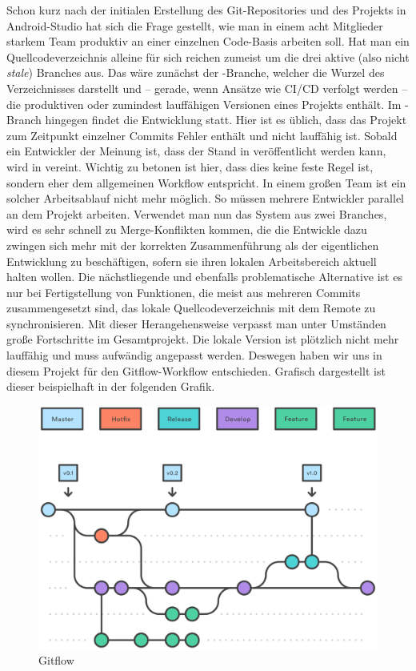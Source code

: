 Schon kurz nach der initialen Erstellung des Git-Repositories und des Projekts in Android-Studio hat sich die Frage gestellt, wie man in einem acht Mitglieder starkem Team produktiv an einer einzelnen Code-Basis arbeiten soll. Hat man ein Quellcodeverzeichnis alleine für sich reichen zumeist um die drei aktive (also nicht \textit{stale}) Branches aus. Das wäre zunächst der -Branche, welcher die Wurzel des Verzeichnisses darstellt und – gerade, wenn Ansätze wie CI/CD verfolgt werden – die produktiven oder zumindest lauffähigen Versionen eines Projekts enthält. Im -Branch hingegen findet die Entwicklung statt. Hier ist es üblich, dass das Projekt zum Zeitpunkt einzelner Commits Fehler enthält und nicht lauffähig ist. Sobald ein Entwickler der Meinung ist, dass der Stand in  veröffentlicht werden kann, wird  in  vereint. Wichtig zu betonen ist hier, dass dies keine feste Regel ist, sondern eher dem allgemeinen Workflow entspricht. In einem großen Team ist ein solcher Arbeitsablauf nicht mehr möglich. So müssen mehrere Entwickler parallel an dem Projekt arbeiten. Verwendet man nun das System aus zwei Branches, wird es sehr schnell zu Merge-Konflikten kommen, die die Entwickle dazu zwingen sich mehr mit der korrekten Zusammenführung als der eigentlichen Entwicklung zu beschäftigen, sofern sie ihren lokalen Arbeitsbereich aktuell halten wollen. Die nächstliegende und ebenfalls problematische Alternative ist es nur bei Fertigstellung von Funktionen, die meist aus mehreren Commits zusammengesetzt sind, das lokale Quellcodeverzeichnis mit dem Remote zu synchronisieren. Mit dieser Herangehensweise verpasst man unter Umständen große Fortschritte im Gesamtprojekt. Die lokale Version ist plötzlich nicht mehr lauffähig und muss aufwändig angepasst werden. Deswegen haben wir uns in diesem Projekt für den Gitflow-Workflow entschieden. Grafisch dargestellt ist dieser beispielhaft in der folgenden Grafik.

\begin{figure}[h]
	\includegraphics[width=\columnwidth]{img/gitflow}
	\caption[Gitflow]{Gitflow\footnotemark}
\end{figure}

